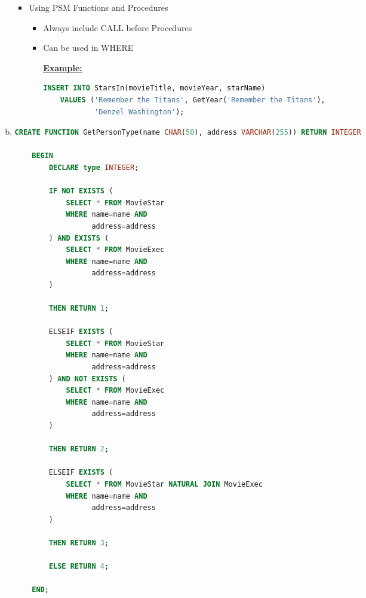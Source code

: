 \documentclass[12pt]{article}
\begin{document}
\begin{enumerate}[1.]
\begin{enumerate}[a)]
\begin{itemize}
            \item Using PSM Functions and Procedures
            \begin{itemize}
                \item Always include CALL before Procedures
                \item Can be used in WHERE

                \bigskip

                \underline{\textbf{Example:}}

                \bigskip

    \begin{lstlisting}[language=SQL]
    INSERT INTO StarsIn(movieTitle, movieYear, starName)
    VALUES ('Remember the Titans', GetYear('Remember the Titans'),
            'Denzel Washington');
    \end{lstlisting}
            \end{itemize}

        \end{itemize}

        \item

    \begin{lstlisting}[language=SQL]
    CREATE FUNCTION GetPersonType(name CHAR(50), address VARCHAR(255)) RETURN INTEGER

    BEGIN
        DECLARE type INTEGER;

        IF NOT EXISTS (
            SELECT * FROM MovieStar
            WHERE name=name AND
                  address=address
        ) AND EXISTS (
            SELECT * FROM MovieExec
            WHERE name=name AND
                  address=address
        )

        THEN RETURN 1;

        ELSEIF EXISTS (
            SELECT * FROM MovieStar
            WHERE name=name AND
                  address=address
        ) AND NOT EXISTS (
            SELECT * FROM MovieExec
            WHERE name=name AND
                  address=address
        )

        THEN RETURN 2;

        ELSEIF EXISTS (
            SELECT * FROM MovieStar NATURAL JOIN MovieExec
            WHERE name=name AND
                  address=address
        )

        THEN RETURN 3;

        ELSE RETURN 4;

    END;
    \end{lstlisting}


\end{enumerate}
\end{enumerate}
\end{document}

